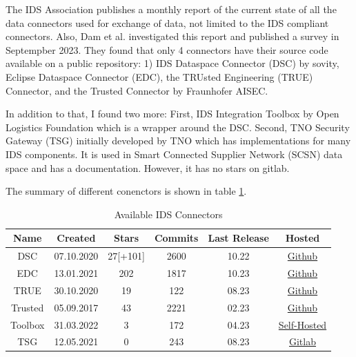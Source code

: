 \documentclass{article}
\begin{document}
The IDS Association publishes a monthly report of the current state of all the data connectors used for exchange of data, not limited to the IDS compliant connectors.
Also, Dam et al. \cite{dam_survey_2023} investigated this report and published a survey in Septempber 2023. They found that only 4 connectors have their source code available on a public repository: 1) IDS Dataspace Connector (DSC) by sovity, Eclipse Dataspace Connector (EDC), the TRUsted Engineering (TRUE) Connector, and the Trusted Connector by Fraunhofer AISEC.

In addition to that, I found two more: First, IDS Integration Toolbox by Open Logistics Foundation which is a wrapper around the DSC. Second, TNO Security Gateway (TSG) initially developed by TNO which has implementations for many IDS components. It is used in Smart Connected Supplier Network (SCSN) data space and has a documentation.
However, it has no stars on gitlab.

The summary of different conenctors is shown in table \ref{tab:connectors}.

\begin{table}[ht]
    \label{tab:connectors}
    \centering
    \begin{tabular}{| c c c c c c|}
    \hline
    \textbf{Name} & \textbf{Created} & \textbf{Stars} & \textbf{Commits} & \textbf{Last Release} & \textbf{Hosted} \\
    \hline
    \hline
    DSC & 07.10.2020 & 27[+101] & 2600 & 10.22 & \href{https://github.com/International-Data-Spaces-Association/DataspaceConnector}{Github} \\
    \hline
    EDC & 13.01.2021 & 202 & 1817 & 10.23 & \href{https://github.com/eclipse-edc/Connector}{Github} \\
    \hline
    TRUE & 30.10.2020 & 19 & 122 & 08.23 & \href{https://github.com/Engineering-Research-and-Development/true-connector}{Github} \\
    \hline
    Trusted & 05.09.2017 & 43 & 2221 & 02.23 & \href{https://github.com/Fraunhofer-AISEC/trusted-connector}{Github} \\ 
    \hline
    Toolbox & 31.03.2022 & 3 & 172 & 04.23 & \href{https://git.openlogisticsfoundation.org/silicon-economy/base/ids/ids-integration-toolbox}{Self-Hosted} \\
    \hline
    TSG & 12.05.2021 & 0 & 243 & 08.23 & \href{https://gitlab.com/tno-tsg}{Gitlab} \\
    \hline
    \end{tabular}
    \caption{Available IDS Connectors}
\end{table}
\end{document}
